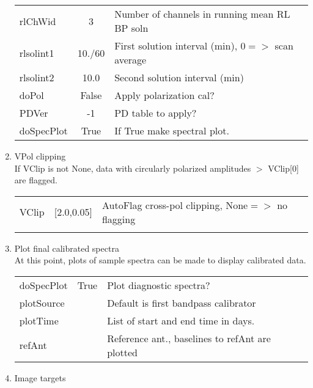 \documentclass[11pt]{article}
\begin{document}
\begin{enumerate}
\begin{center}
\begin{tabular}{|l|c|l|}
rlChWid     & 3            & Number of channels in running mean RL BP soln\\
rlsolint1   & 10./60       & First solution interval (min), $0=>$ scan average\\
rlsolint2   & 10.0         & Second solution interval (min)\\
doPol       & False        & Apply polarization cal?\\
PDVer       & -1           & PD table to apply?\\
doSpecPlot  & True         & If True make spectral plot.\\
\hline
\end{tabular}
\end{center}
%
\item VPol clipping\\
If VClip is not None, data with circularly polarized amplitudes $>$
VClip[0] are flagged. 
\begin{center}
\begin{tabular}{|l|c|l|}
\hline
VClip  & [2.0,0.05] & AutoFlag cross-pol clipping, None$=>$ no flagging  \\
  &  &  \\
\hline
\end{tabular}
\end{center}
%
\item Plot final calibrated spectra\\
At this point, plots of sample spectra can be made to display
calibrated data.
\begin{center}
\begin{tabular}{|l|c|l|}
\hline
doSpecPlot     & True &  Plot diagnostic spectra?\\
plotSource     &      & Default is first bandpass calibrator\\
plotTime       &      & List of start and end time in days.\\
refAnt         &      & Reference ant., baselines to refAnt are plotted \\
\hline
\end{tabular}
\end{center}
%
\item Image targets \\

\end{enumerate}
\end{document}
